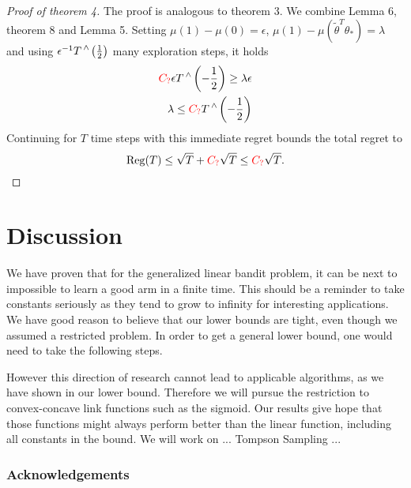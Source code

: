 \documentclass[twoside]{article} \usepackage{aistats2017}
\DeclareMathOperator\caret{\raisebox{1ex}{$\scriptstyle\wedge$}}
\newcommand{\Reg} {
  \operatorname{Reg}}
\newcommand{\uc}{
\color{red}C_?\color{black}
}
\begin{document}
\begin{proof}[Proof of theorem 4]
  The proof is analogous to theorem 3. We combine Lemma 6, theorem 8 and Lemma 5. Setting $\mu(1)-\mu(0)=\epsilon$, $\mu(1)-\mu(\tilde{\theta}^T\theta_*)=\lambda$ and using $\epsilon^{-1}T\caret\left(\frac{1}{2}\right)$ many exploration steps, it holds
 \begin{align*}
     \uc\epsilon T\caret\left(-\frac{1}{2}\right)  \geq \lambda \epsilon\\
     \lambda \leq \uc T\caret\left(-\frac{1}{2}\right)\\
 \end{align*}
 Continuing for $T$ time steps with this immediate regret bounds the total regret to
 $$\Reg(T) \leq \sqrt{T}+\uc \sqrt{T} \leq \uc\sqrt{T}.$$
\end{proof}
\section{Discussion}
We have proven that for the generalized linear bandit problem, it can be next to impossible to learn a good arm in a finite time. This should be a reminder to take constants seriously as they tend to grow to infinity for interesting applications. We have good reason to believe that our lower bounds are tight, even though we assumed a restricted problem. In order to get a general lower bound, one would need to take the following steps.
However this direction of research cannot lead to applicable algorithms, as we have shown in our lower bound. Therefore we will pursue the restriction to convex-concave link functions such as the sigmoid. Our results give hope that those functions might always perform better than the linear function, including all constants in the bound. We will work on ... Tompson Sampling ... 



\newpage



\subsubsection*{Acknowledgements}
\end{document}
